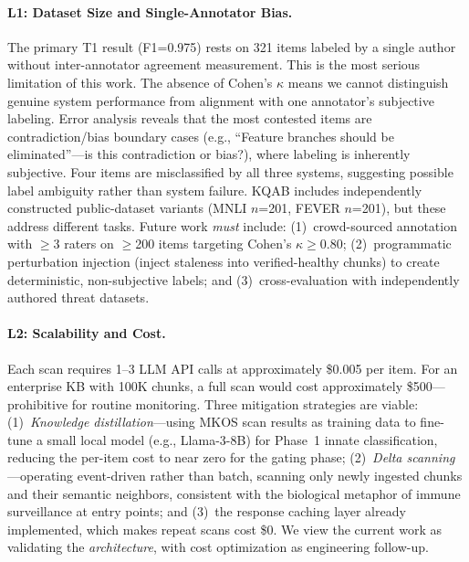 \documentclass[11pt]{article}
\begin{document}
\paragraph{L1: Dataset Size and Single-Annotator Bias.} The primary T1 result (F1=0.975) rests on 321 items labeled by a single author without inter-annotator agreement measurement. This is the most serious limitation of this work. The absence of Cohen's $\kappa$ means we cannot distinguish genuine system performance from alignment with one annotator's subjective labeling. Error analysis reveals that the most contested items are contradiction/bias boundary cases (e.g., ``Feature branches should be eliminated''---is this contradiction or bias?), where labeling is inherently subjective. Four items are misclassified by all three systems, suggesting possible label ambiguity rather than system failure. KQAB includes independently constructed public-dataset variants (MNLI $n$=201, FEVER $n$=201), but these address different tasks. Future work \emph{must} include: (1)~crowd-sourced annotation with $\geq$3 raters on $\geq$200 items targeting Cohen's $\kappa \geq 0.80$; (2)~programmatic perturbation injection (inject staleness into verified-healthy chunks) to create deterministic, non-subjective labels; and (3)~cross-evaluation with independently authored threat datasets.

\paragraph{L2: Scalability and Cost.} Each scan requires 1--3 LLM API calls at approximately \$0.005 per item. For an enterprise KB with 100K chunks, a full scan would cost approximately \$500---prohibitive for routine monitoring. Three mitigation strategies are viable: (1)~\emph{Knowledge distillation}---using MKOS scan results as training data to fine-tune a small local model (e.g., Llama-3-8B) for Phase~1 innate classification, reducing the per-item cost to near zero for the gating phase; (2)~\emph{Delta scanning}---operating event-driven rather than batch, scanning only newly ingested chunks and their semantic neighbors, consistent with the biological metaphor of immune surveillance at entry points; and (3)~the response caching layer already implemented, which makes repeat scans cost \$0. We view the current work as validating the \emph{architecture}, with cost optimization as engineering follow-up.
\end{document}
